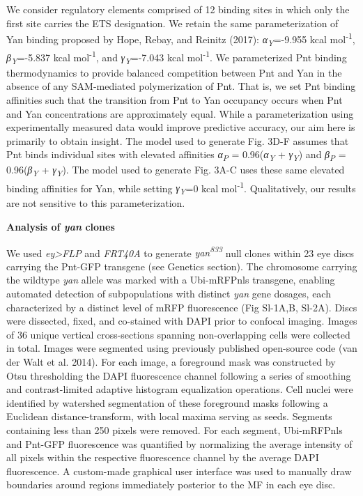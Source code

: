 We consider regulatory elements comprised of 12 binding sites in which only the first site carries the ETS designation. We retain the same parameterization of Yan binding proposed by Hope, Rebay, and Reinitz (2017): \emph{α\textsubscript{Y}}=-9.955 kcal mol\textsuperscript{-1}, \emph{β\textsubscript{Y}}=-5.837 kcal mol\textsuperscript{-1}, and \emph{γ\textsubscript{Y}}=-7.043 kcal mol\textsuperscript{-1}. We parameterized Pnt binding thermodynamics to provide balanced competition between Pnt and Yan in the absence of any SAM-mediated polymerization of Pnt. That is, we set Pnt binding affinities such that the transition from Pnt to Yan occupancy occurs when Pnt and Yan concentrations are approximately equal. While a parameterization using experimentally measured data would improve predictive accuracy, our aim here is primarily to obtain insight. The model used to generate Fig. 3D-F assumes that Pnt binds individual sites with elevated affinities \emph{α\textsubscript{P}} = 0.96(\emph{α\textsubscript{Y}} + \emph{γ\textsubscript{Y}}) and \emph{β\textsubscript{P}} = 0.96(\emph{β\textsubscript{Y}} + \emph{γ\textsubscript{Y}}). The model used to generate Fig. 3A-C uses these same elevated binding affinities for Yan, while setting \emph{γ\textsubscript{Y}}=0 kcal mol\textsuperscript{-1}. Qualitatively, our results are not sensitive to this parameterization.

\textbf{Analysis of \emph{yan} clones}

We used \emph{ey\textgreater{}FLP} and \emph{FRT40A} to generate \emph{yan\textsuperscript{833}} null clones within 23 eye discs carrying the Pnt-GFP transgene (see Genetics section). The chromosome carrying the wildtype \emph{yan} allele was marked with a Ubi-mRFPnls transgene, enabling automated detection of subpopulations with distinct \emph{yan} gene dosages, each characterized by a distinct level of mRFP fluorescence (Fig Sl-1A,B, Sl-2A). Discs were dissected, fixed, and co-stained with DAPI prior to confocal imaging. Images of 36 unique vertical cross-sections spanning non-overlapping cells were collected in total. Images were segmented using previously published open-source code (van der Walt et al. 2014). For each image, a foreground mask was constructed by Otsu thresholding the DAPI fluorescence channel following a series of smoothing and contrast-limited adaptive histogram equalization operations. Cell nuclei were identified by watershed segmentation of these foreground masks following a Euclidean distance-transform, with local maxima serving as seeds. Segments containing less than 250 pixels were removed. For each segment, Ubi-mRFPnls and Pnt-GFP fluorescence was quantified by normalizing the average intensity of all pixels within the respective fluorescence channel by the average DAPI fluorescence. A custom-made graphical user interface was used to manually draw boundaries around regions immediately posterior to the MF in each eye disc.


